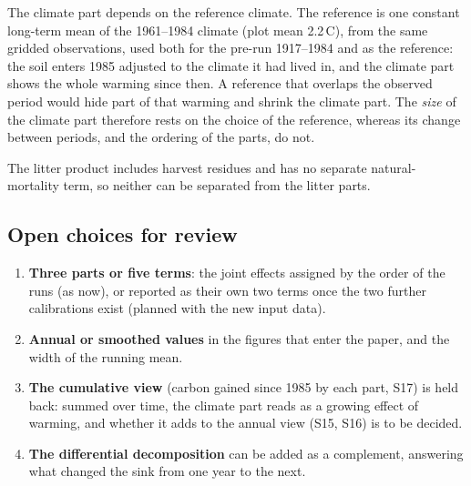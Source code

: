 \documentclass[../HIKET_draft_v1.tex]{subfiles}
\begin{document}
The climate part depends on the reference climate. The reference is one constant long-term
mean of the 1961--1984 climate (plot mean 2.2\,\textdegree C), from the same gridded
observations, used both for the pre-run 1917--1984 and as the reference: the soil enters 1985
adjusted to the climate it had lived in, and the climate part shows the whole warming since
then. A reference that overlaps the observed period would hide part of that warming and
shrink the climate part. The \emph{size} of the climate part therefore rests on the choice of
the reference, whereas its change between periods, and the ordering of the parts, do not.

The litter product includes harvest residues and has no separate natural-mortality term, so
neither can be separated from the litter parts.

\subsection{Open choices for review}
\label{app:attribution_open}
\begin{enumerate}
  \item \textbf{Three parts or five terms}: the joint effects assigned by the order of the runs
    (as now), or reported as their own two terms once the two further calibrations exist
    (planned with the new input data).
  \item \textbf{Annual or smoothed values} in the figures that enter the paper, and the width
    of the running mean.
  \item \textbf{The cumulative view} (carbon gained since 1985 by each part, S17) is held
    back: summed over time, the climate part reads as a growing effect of warming, and
    whether it adds to the annual view (S15, S16) is to be decided.
  \item \textbf{The differential decomposition} can be added as a complement, answering what
    changed the sink from one year to the next.
\end{enumerate}
\end{document}
